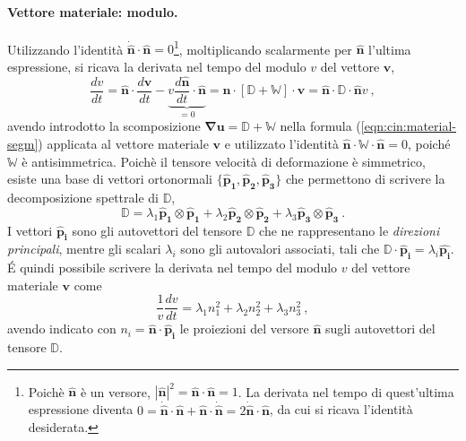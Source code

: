 \paragraph{Vettore materiale: modulo.}
Utilizzando l'identità $\bm{\dot{\hat{n}}} \cdot \bm{\hat{n}} = 0$\footnote{
 Poichè $\bm{\hat{n}}$ è un versore, $|\bm{\hat{n}}|^2 = \bm{\hat{n}}\cdot\bm{\hat{n}} = 1$. La derivata nel tempo di quest'ultima espressione diventa $0 = \bm{\dot{\hat{n}}} \cdot \bm{\hat{n}} + \bm{\hat{n}} \cdot \bm{\dot{\hat{n}}} = 2 \bm{\dot{\hat{n}}} \cdot \bm{\hat{n}}$, da cui si ricava l'identità desiderata.
}, moltiplicando scalarmente per $\bm{\hat{n}}$ l'ultima espressione, si ricava la derivata nel tempo del modulo $v$ del vettore $\bm{v}$,
\begin{equation}\label{eqn:cin:dvmod}
 \dfrac{d v}{d t} = \bm{\hat{n}} \cdot \dfrac{d \bm{v}}{dt} 
 - \underbrace{v \dfrac{d\bm{\hat{n}}}{dt}\cdot\bm{\hat{n}}}_{=0} = \bm{\hat{n}} \cdot \left[ \mathbb{D} + \mathbb{W} \right] \cdot \bm{v} = 
 \bm{\hat{n}} \cdot \mathbb{D} \cdot \bm{\hat{n}} v \ ,
\end{equation}
avendo introdotto la scomposizione $\bm{\nabla} \bm{u} = \mathbb{D} + \mathbb{W}$ nella formula (\ref{eqn:cin:material-segm}) applicata al vettore materiale $\bm{v}$ e utilizzato l'identità $\bm{\hat{n}} \cdot \mathbb{W} \cdot \bm{\hat{n}} = 0$, poiché $\mathbb{W}$ è antisimmetrica.
Poichè il tensore velocità di deformazione è simmetrico, esiste una base di vettori ortonormali $\{\bm{\hat{p}_1},\bm{\hat{p}_2},\bm{\hat{p}_3}\}$ che permettono di scrivere la decomposizione spettrale di $\mathbb{D}$,
\begin{equation}
 \mathbb{D} = \lambda_1 \bm{\hat{p}_1} \otimes \bm{\hat{p}_1} +
              \lambda_2 \bm{\hat{p}_2} \otimes \bm{\hat{p}_2} +
              \lambda_3 \bm{\hat{p}_3} \otimes \bm{\hat{p}_3} \ .
\end{equation}
I vettori $\bm{\hat{p}_i}$ sono gli autovettori del tensore $\mathbb{D}$ che ne rappresentano le \textit{direzioni principali}, mentre gli scalari $\lambda_i$ sono gli autovalori associati, tali che $\mathbb{D} \cdot \bm{\hat{p}_i} = \lambda_i \bm{\hat{p_i}}$. \'E quindi possibile scrivere la derivata nel tempo del modulo $v$ del vettore materiale $\bm{v}$ come
\begin{equation}
 \dfrac{1}{v} \dfrac{d v}{d t} = \lambda_1 n_1^2 +  \lambda_2 n_2^2 +  \lambda_3 n_3^2 \ ,
\end{equation}
avendo indicato con $n_i = \bm{\hat{n}} \cdot \bm{\hat{p}_i}$ le proiezioni del versore $\bm{\hat{n}}$ sugli autovettori del tensore $\mathbb{D}$.
%

